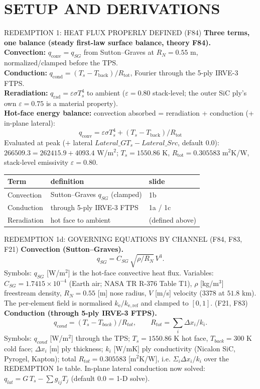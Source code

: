 \documentclass[aspectratio=169,11pt]{beamer}
\begin{document}
\section{SETUP AND DERIVATIONS}
\begin{frame}{REDEMPTION 1: HEAT FLUX PROPERLY DEFINED (F84)}
  \small
  \textbf{Three terms, one balance (steady first-law surface balance, theory F84).}\\
  \textbf{Convection:} $q_{\mathrm{conv}}=q_{SG}$ from Sutton--Graves at $R_N=0.55$ m,
  normalized/clamped before the TPS.\\
  \textbf{Conduction:} $q_{\mathrm{cond}}=(T_s-T_{\mathrm{back}})/R_{\mathrm{tot}}$,
  Fourier through the 5-ply IRVE-3 FTPS.\\
  \textbf{Reradiation:} $q_{\mathrm{rad}}=\varepsilon\sigma T_s^4$ to ambient
  ($\varepsilon=0.80$ stack-level; the outer SiC ply's own $\varepsilon=0.75$
  is a material property).\\
  \textbf{Hot-face energy balance:} convection absorbed = reradiation + conduction
  (+ in-plane lateral):
  \[
  q_{\mathrm{conv}} = \varepsilon\sigma T_s^4 + (T_s - T_{\mathrm{back}})/R_{\mathrm{tot}}
  \]
  Evaluated at peak ($+$ lateral $Lateral\_G T_s - Lateral\_Src$, default 0.0):
  $266509.3 = 262415.9 + 4093.4$ W/m$^2$;
  $T_s=1550.86$ K, $R_{\mathrm{tot}}=0.305583$ m$^2$K/W,
  stack-level emissivity $\varepsilon=0.80$.\\
  \begin{tabular}{@{}lll@{}}
  \textbf{Term} & \textbf{definition} & \textbf{slide}\\
  \hline
  Convection & Sutton--Graves $q_{SG}$ (clamped) & 1b\\
  Conduction & through 5-ply IRVE-3 FTPS & 1a / 1c\\
  Reradiation & hot face to ambient & (defined above)\\
  \end{tabular}
\end{frame}
\begin{frame}{REDEMPTION 1d: GOVERNING EQUATIONS BY CHANNEL (F84, F83, F21)}
  \small
  \textbf{Convection (Sutton--Graves).}
  \[
    q_{SG}=C_{SG}\,\sqrt{\rho/R_N}\,V^3.
  \]
  Symbols: $q_{SG}$ [W/m$^2$] is the hot-face convective heat flux.
  Variables: $C_{SG}=1.7415\times 10^{-4}$ (Earth air; NASA TR R-376 Table T1),
  $\rho$ [kg/m$^3$] freestream density, $R_N=0.55$ [m] nose radius,
  $V$ [m/s] velocity ($3378$ at $51.8$ km). The per-element field is normalised
  $k_{\mathrm{e}}/k_{\mathrm{e,ref}}$ and clamped to $[0,1]$. (F21, F83) \\

  \textbf{Conduction (through 5-ply IRVE-3 FTPS).}
  \[
    q_{cond}=(T_s-T_{back})/R_{tot},\qquad
    R_{tot}=\sum_i \Delta x_i/k_i.
  \]
  Symbols: $q_{cond}$ [W/m$^2$] through the TPS; $T_s=1550.86$ K hot face,
  $T_{back}=300$ K cold face; $\Delta x_i$ [m] ply thickness; $k_i$ [W/mK]
  ply conductivity (Nicalon SiC, Pyrogel, Kapton); total
  $R_{tot}=0.305583$ [m$^2$K/W], i.e. $\Sigma_i\Delta x_i/k_i$ over the
  REDEMPTION 1e table. In-plane lateral conduction now solved:
  $q_{lat}=G\,T_s-\sum g_{ij}T_j$ (default 0.0 = 1-D solve).
\end{frame}
\end{document}
